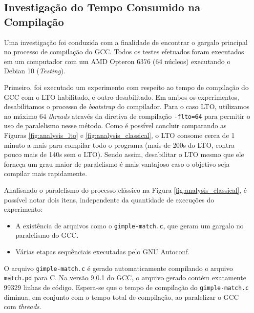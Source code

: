 \subsection{Investigação do Tempo Consumido na Compilação}

Uma investigação foi conduzida com a finalidade de encontrar o gargalo
principal no processo de compilação do GCC. Todos os testes efetuados foram
executados em um computador com um AMD Opteron 6376 (64 núcleos) executando
o Debian 10 (\textit{Testing}).

Primeiro, foi executado um experimento com respeito ao tempo de compilação
do GCC com o LTO habilitado, e outro desabilitado. Em ambos os experimentos,
desabilitamos o processo de \textit{bootstrap} do compilador. Para o caso LTO,
utilizamos no máximo 64 \textit{threads} através da diretiva de compilação
\texttt{-flto=64} para permitir o uso de paralelismo nesse método. Como
é possível concluir comparando as Figuras \ref{fig:analysis_lto} e \ref{fig:analysis_classical},
o LTO consome cerca de 1 minuto a mais para compilar todo o programa
(mais de 200s do LTO, contra pouco mais de 140s sem o LTO). Sendo assim,
desabilitar o LTO mesmo que ele forneça um grau maior de paralelismo é
mais vantajoso caso o objetivo seja compilar mais rapidamente.

Analisando o paralelismo do processo clássico na Figura \ref{fig:analysis_classical},
é possível notar dois itens, independente da quantidade de
execuções do experimento:

\begin{itemize}
    \item A existência de arquivos como o \texttt{gimple-match.c}, que
        geram um gargalo no paralelismo do GCC.

    \item Várias etapas sequênciais executadas pelo GNU Autoconf.
\end{itemize}

O arquivo \texttt{gimple-match.c} é gerado automaticamente compilando
o arquivo \texttt{match.pd} para C. Na versão 9.0.1 do GCC, o arquivo
gerado contém exatamente 99329 linhas de código. Espera-se que o tempo
de compilação do \texttt{gimple-match.c} diminua, em conjunto com o tempo
total de compilação, ao paralelizar o GCC com \textit{threads}.


